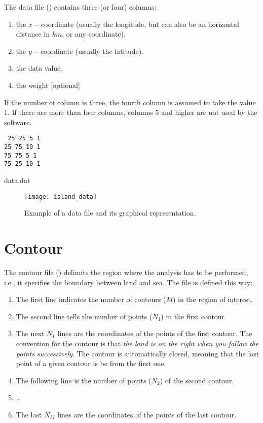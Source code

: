 The data file () contains three (or four) columns: 
\begin{enumerate}
\item the $x-$coordinate (usually the longitude, but can also be an horizontal distance in $km$, or any coordinate).
\item the $y-$coordinate (usually the latitude).
\item the data value.
\item the weight [optional] 
\end{enumerate}
If the number of column is three, the fourth column is assumed to take the value $1$. If there are more than four columns, columns 5 and higher are not used by the software.%

\begin{exfile}[htpb]
\begin{footnotesize}
\texttt{
25 25  5 1\\
25 75 10 1\\
75 75  5 1\\
75 25 10 1} 
\end{footnotesize}
\caption{data.dat\label{ex:data.dat}}
\end{exfile}


\begin{figure}[H]
\centering
\texttt{[image: island\_data]}
\caption{Example of a data file and its graphical representation.}
\end{figure}


\section{Contour\label{contourdiva}}

The contour file () delimits the region where the analysis has to be performed, i.e., it specifies the boundary between land and sea. The file is defined this way:
\begin{enumerate}
\item The first line indicates the number of contours ($M$) in the region of interest.
\item The second line tells the number of points ($N_{1}$) in the first contour.
\item The next $N_1$ lines are the coordinates of the points of the first contour. The convention for the contour is that \textit{the land is on the right when you follow the points successively}. The contour is automatically closed, meaning that the last point of a given contour is be from the first one. 
\item The following line is the number of points ($N_{2}$) of the second contour.
\item \ldots
\item The last $N_M$ lines are the coordinates of the points of the last contour.
\end{enumerate}

